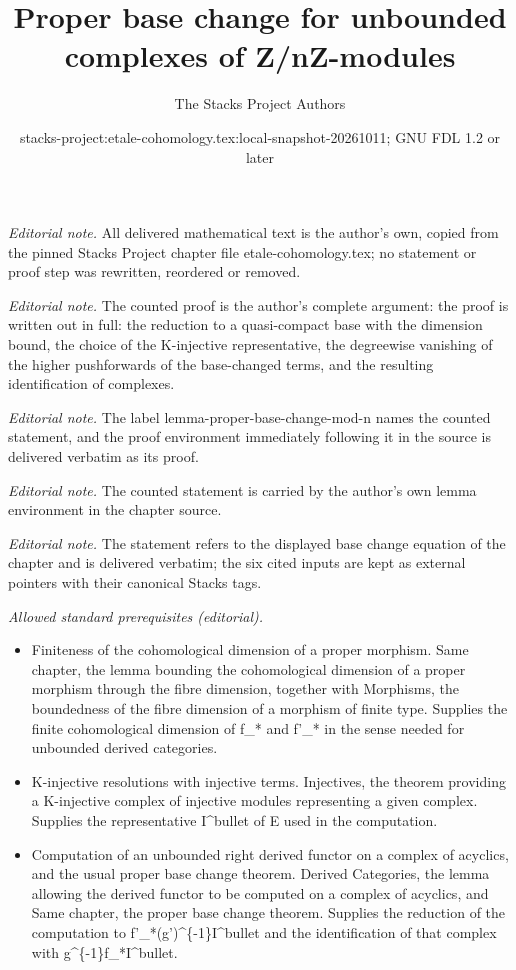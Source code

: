 \documentclass[10pt,a4paper]{amsart}
\title{Proper base change for unbounded complexes of Z/nZ-modules}
\author{The Stacks Project Authors}
\date{stacks-project:etale-cohomology.tex:local-snapshot-20261011; GNU FDL 1.2 or later}
\theoremstyle{plain}
\theoremstyle{definition}
\theoremstyle{remark}
\numberwithin{equation}{subsection}
\begin{document}
\maketitle
\noindent\textit{Editorial note.} All delivered mathematical text is the author's own, copied from the pinned Stacks Project chapter file etale-cohomology.tex; no statement or proof step was rewritten, reordered or removed.\par\medskip
\noindent\textit{Editorial note.} The counted proof is the author's complete argument: the proof is written out in full: the reduction to a quasi-compact base with the dimension bound, the choice of the K-injective representative, the degreewise vanishing of the higher pushforwards of the base-changed terms, and the resulting identification of complexes.\par\medskip
\noindent\textit{Editorial note.} The label lemma-proper-base-change-mod-n names the counted statement, and the proof environment immediately following it in the source is delivered verbatim as its proof.\par\medskip
\noindent\textit{Editorial note.} The counted statement is carried by the author's own lemma environment in the chapter source.\par\medskip
\noindent\textit{Editorial note.} The statement refers to the displayed base change equation of the chapter and is delivered verbatim; the six cited inputs are kept as external pointers with their canonical Stacks tags.\par\medskip
\noindent\textit{Allowed standard prerequisites (editorial).}\begin{itemize}
\item Finiteness of the cohomological dimension of a proper morphism. Same chapter, the lemma bounding the cohomological dimension of a proper morphism through the fibre dimension, together with Morphisms, the boundedness of the fibre dimension of a morphism of finite type. Supplies the finite cohomological dimension of f\_* and f'\_* in the sense needed for unbounded derived categories.
\item K-injective resolutions with injective terms. Injectives, the theorem providing a K-injective complex of injective modules representing a given complex. Supplies the representative I\textasciicircum{}bullet of E used in the computation.
\item Computation of an unbounded right derived functor on a complex of acyclics, and the usual proper base change theorem. Derived Categories, the lemma allowing the derived functor to be computed on a complex of acyclics, and Same chapter, the proper base change theorem. Supplies the reduction of the computation to f'\_*(g')\textasciicircum{}\{-1\}I\textasciicircum{}bullet and the identification of that complex with g\textasciicircum{}\{-1\}f\_*I\textasciicircum{}bullet.
\end{itemize}\medskip
\end{document}
